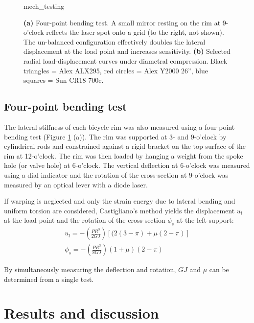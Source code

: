\documentclass[../thesis.tex]{subfiles}
\begin{document}
\begin{figure}
  \centering
  {mech_testing}
  \caption{\textbf{(a)} Four-point bending test. A small mirror resting on the rim at 9-o’clock reflects the laser spot onto a grid (to the right, not shown). The un-balanced configuration effectively doubles the lateral displacement at the load point and increases sensitivity. \textbf{(b)} Selected radial load-displacement curves under diametral compression. Black triangles = Alex ALX295, red circles = Alex Y2000 26'', blue squares = Sun CR18 700c.}
  \label{fig:mech_tests}
\end{figure}

\subsection{Four-point bending test}

The lateral stiffness of each bicycle rim was also measured using a four-point bending test (Figure \ref{fig:mech_tests} (a)). The rim was supported at 3- and 9-o'clock by cylindrical rods and constrained against a rigid bracket on the top surface of the rim at 12-o'clock. The rim was then loaded by hanging a weight from the spoke hole (or valve hole) at 6-o'clock. The vertical deflection at 6-o'clock was measured using a dial indicator and the rotation of the cross-section at 9-o'clock was measured by an optical lever with a diode laser.

If warping is neglected and only the strain energy due to lateral bending and uniform torsion are considered, Castigliano's method yields the displacement $u_l$ at the load point and the rotation of the cross-section $\phi_s$ at the left support:
  \begin{equation}\label{eq:u_4p}
  \begin{array}{c}
  u_l = -\left(\frac{PR^3}{2GJ}\right) [(2(3-\pi)+\mu(2-\pi)]\\
  \phi_s = -\left(\frac{PR^3}{8GJ}\right) (1+\mu)(2-\pi)
  \end{array}
  \end{equation}

By simultaneously measuring the deflection and rotation, $GJ$ and $\mu$ can be determined from a single test.

\section{Results and discussion}
\end{document}
